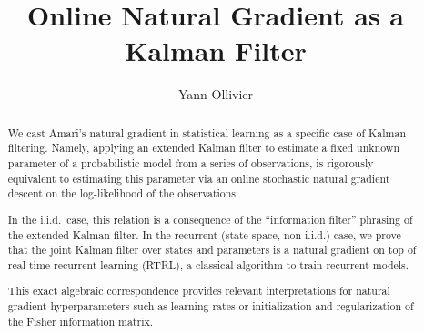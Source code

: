 \documentclass[11pt,a4paper]{article}
\title{Online Natural Gradient as a Kalman Filter}
\author{Yann Ollivier}
\date{}
\newcommand{\1}{\mathbbm{1}}
\theoremstyle{yannthm}
\theoremstyle{yannthm2}
\numberwithin{equation}{section}
\begin{document}
\maketitle


\begin{abstract}
We cast Amari's natural gradient in statistical learning as a specific
case of Kalman filtering.
Namely, applying an extended Kalman filter to estimate a fixed unknown
parameter of a probabilistic model from a series of observations, is
rigorously equivalent to estimating this parameter via
an online stochastic natural gradient descent on the log-likelihood of the
observations.

In the i.i.d.\ case, this relation
is a consequence of the ``information filter'' phrasing of
the extended Kalman filter.  
In the recurrent (state space, non-i.i.d.) case, we prove that the joint Kalman filter over states
and parameters is a natural gradient on top of real-time recurrent
learning (RTRL), a classical algorithm to train recurrent models.

This exact algebraic correspondence provides relevant interpretations for natural
gradient hyperparameters such as learning rates or initialization and
regularization of the Fisher information matrix.
\end{abstract}

\end{document}
